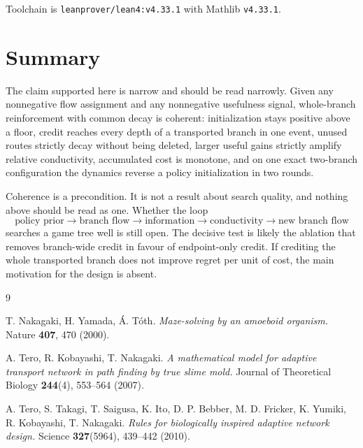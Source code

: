 \documentclass[11pt,a4paper]{article}
\theoremstyle{definition}
\newcommand{\lean}[1]{\texttt{#1}}
\begin{document}
Toolchain is \lean{leanprover/lean4:v4.33.1} with Mathlib \lean{v4.33.1}.

\section{Summary}

The claim supported here is narrow and should be read narrowly. Given any
nonnegative flow assignment and any nonnegative usefulness signal, whole-branch
reinforcement with common decay is coherent: initialization stays positive
above a floor, credit reaches every depth of a transported branch in one event,
unused routes strictly decay without being deleted, larger useful gains
strictly amplify relative conductivity, accumulated cost is monotone, and on
one exact two-branch configuration the dynamics reverse a policy initialization
in two rounds.

Coherence is a precondition. It is not a result about search quality, and
nothing above should be read as one. Whether the loop
\begin{equation}
  \text{policy prior} \rightarrow \text{branch flow} \rightarrow
  \text{information} \rightarrow \text{conductivity} \rightarrow
  \text{new branch flow}
\end{equation}
searches a game tree well is still open. The decisive test is likely the
ablation that removes branch-wide credit in favour of endpoint-only credit. If
crediting the whole transported branch does not improve regret per unit of
cost, the main motivation for the design is absent.

\begin{thebibliography}{9}

T. Nakagaki, H. Yamada, \'A. T\'oth.
\emph{Maze-solving by an amoeboid organism.}
Nature \textbf{407}, 470 (2000).

A. Tero, R. Kobayashi, T. Nakagaki.
\emph{A mathematical model for adaptive transport network in path finding by
true slime mold.}
Journal of Theoretical Biology \textbf{244}(4), 553--564 (2007).

A. Tero, S. Takagi, T. Saigusa, K. Ito, D. P. Bebber, M. D. Fricker,
K. Yumiki, R. Kobayashi, T. Nakagaki.
\emph{Rules for biologically inspired adaptive network design.}
Science \textbf{327}(5964), 439--442 (2010).

\end{thebibliography}
\end{document}
